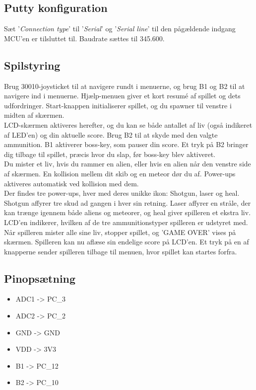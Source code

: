 
\subsection{Putty konfiguration}
Sæt '\textit{Connection type}' til '\textit{Serial}' og '\textit{Serial line}' til den pågældende indgang MCU'en er tilsluttet til. Baudrate sættes til 345.600.

\subsection{Spilstyring}
Brug 30010-joysticket til at navigere rundt i menuerne, og brug B1 og B2 til at navigere ind i menuerne. Hjælp-menuen giver et kort resumé af spillet og dets udfordringer. Start-knappen initialiserer spillet, og du spawner  til venstre i midten af skærmen.\\
LCD-skærmen aktiveres herefter, og du kan se både antallet af liv (også indikeret af LED’en) og din aktuelle score. Brug B2 til at skyde med den valgte ammunition. B1 aktiverer boss-key, som pauser din score. Et tryk på B2 bringer dig tilbage til spillet, præcis hvor du slap, før boss-key blev aktiveret.\\
Du mister et liv, hvis du rammer en alien, eller hvis en alien når den venstre side af skærmen. En kollision mellem dit skib og en meteor dør du af. Power-ups aktiveres automatisk ved kollision med dem.\\
Der findes tre power-ups, hver med deres unikke ikon: Shotgun, laser og heal. Shotgun affyrer tre skud ad gangen i hver sin retning. Laser affyrer en stråle, der kan trænge igennem både aliens og meteorer, og heal giver spilleren et ekstra liv. LCD’en indikerer, hvilken af de tre ammunitionstyper spilleren er udstyret med.\\
Når spilleren mister alle sine liv, stopper spillet, og 'GAME OVER' vises på skærmen. Spilleren kan nu aflæse sin endelige score på LCD’en. Et tryk på en af knapperne sender spilleren tilbage til menuen, hvor spillet kan startes forfra.

\subsection{\textbf{Pinopsætning}}
\begin{itemize}
    \item ADC1 -> PC\_3 
    \item ADC2 -> PC\_2
    \item GND -> GND 
    \item VDD -> 3V3
    \item B1 -> PC\_12
    \item B2 -> PC\_10
\end{itemize}